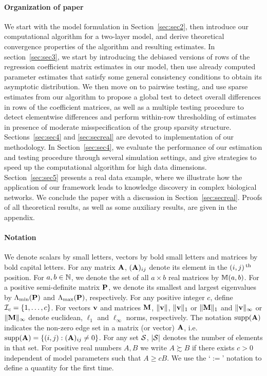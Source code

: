 \paragraph{Organization of paper}
We start with the model formulation in Section~\ref{sec:sec2}, then introduce our computational algorithm for a two-layer model, and derive theoretical convergence properties of the algorithm and resulting estimates. In section~\ref{sec:sec3}, we start by introducing the debiased versions of rows of the regression coefficient matrix estimates in our model, then use already computed parameter estimates that satisfy some general consistency conditions to obtain its asymptotic distribution. We then move on to pairwise testing, and use sparse estimates from our algorithm to propose a global test to detect overall differences in rows of the coefficient matrices, as well as a multiple testing procedure to detect elementwise differences and perform within-row thresholding of estimates in presence of moderate misspecification of the group sparsity structure. Sections~\ref{sec:sec4} and \ref{sec:secreal} are devoted to implementation of our methodology. In Section~\ref{sec:sec4}, we evaluate the performance of our estimation and testing procedure through several simulation settings, and give strategies to speed up the computational algorithm for high data dimensions. Section~\ref{sec:sec5} presents a real data example, where we illustrate how the application of our framework leads to knowledge discovery in complex biological networks. We conclude the paper with a discussion in Section~\ref{sec:secreal}. Proofs of all theoretical results, as well as some auxiliary results, are given in the appendix.

\paragraph{Notation}
We denote scalars by small letters, vectors by bold small letters and matrices by bold capital letters. For any matrix ${\mathbf{A}}$, $({\mathbf{A}})_{ij}$ denote its element in the $(i,j)\operatorname*{^{\text{th}}}$ position. For $a,b \in {\mathbb{N}}$, we denote the set of all $a \times b$ real matrices by ${\mathbb{M}}(a,b)$. For a positive semi-definite matrix ${\mathbf{P}}$, we denote its smallest and largest eigenvalues by $\Lambda_{\min} ({\mathbf{P}})$ and $\Lambda_{\max} ({\mathbf{P}})$, respectively. For any positive integer $c$, define ${\cal{I}}_c = \{ 1, \ldots, c\}$. For vectors ${\bf{v}}$ and matrices ${\mathbf{M}}$, $\| {\bf{v}} \|$, $\|{\bf{v}} \|_1$ or $\|{\mathbf{M}} \|_1$ and $\|{\bf{v}} \|_\infty$ or $\|{\mathbf{M}} \|_\infty$ denote euclidean, $\ell_1$ and $\ell_\infty$ norms, respectively. The notation $\operatorname*{supp}({\mathbf{A}})$ indicates the non-zero edge set in a matrix (or vector) ${\mathbf{A}}$, i.e. $\operatorname*{supp}({\mathbf{A}}) = \{(i,j): ({\mathbf{A}})_{ij} \neq 0\}$. For any set ${\cal{S}}$, $| {\cal{S}}|$ denotes the number of elements in that set. For positive real numbers $A, B$ we write $A \succsim B$ if there exists $c>0$ independent of model parameters such that $A \geq cB$. We use the `$:=$' notation to define a quantity for the first time.